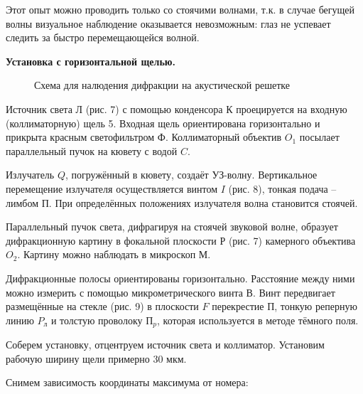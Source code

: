\documentclass[14pt]{article}
\begin{document}
Этот опыт можно проводить только со стоячими волнами, т.к. в случае бегущей волны визуальное наблюдение оказывается невозможным: глаз не успевает следить за быстро перемещающейся волной.

\textbf{Установка с горизонтальной щелью.}

\begin{figure}[h!]
	\caption{Схема для налюдения дифракции на акустической решетке}
	\label{fig:image}
\end{figure}

Источник света Л (рис. 7) с помощью конденсора К проецируется на входную (коллиматорную) щель 5. Входная щель ориентирована горизонтально и прикрыта красным светофильтром Ф. Коллиматорный объектив $O_1$ посылает параллельный пучок на кювету с водой $C$.

Излучатель $Q$, погружённый в кювету, создаёт УЗ-волну. Вертикальное перемещение излучателя осуществляется винтом $I$ (рис. 8), тонкая подача -- лимбом П. При определённых положениях излучателя волна становится стоячей.

Параллельный пучок света, дифрагируя на стоячей звуковой волне, образует дифракционную картину в фокальной плоскости Р (рис. 7) камерного объектива $O_2$. Картину можно наблюдать в микроскоп М.

Дифракционные полосы ориентированы горизонтально. Расстояние между ними можно измерить с помощью микрометрического винта В. Винт передвигает размещённые на стекле (рис. 9) в плоскости $F$ перекрестие П, тонкую реперную линию $P_{\text{л}}$ и толстую проволоку $\text{П}_p$, которая используется в методе тёмного поля.

Соберем установку, отцентруем источник света и коллиматор. Установим рабочую ширину щели примерно 30 мкм.

Снимем зависимость координаты максимума от номера:
\end{document}
